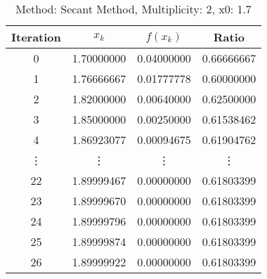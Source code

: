 \begin{table}
\centering
\caption{Method: Secant Method, Multiplicity: 2, x0: 1.7}
\label{tab:table_Secant_Method_2_1_7}
\begin{tabular}{c c c c}
\toprule
Iteration &      $x_k$ &   $f(x_k)$ &      Ratio \\
\midrule
        0 & 1.70000000 & 0.04000000 & 0.66666667 \\
        1 & 1.76666667 & 0.01777778 & 0.60000000 \\
        2 & 1.82000000 & 0.00640000 & 0.62500000 \\
        3 & 1.85000000 & 0.00250000 & 0.61538462 \\
        4 & 1.86923077 & 0.00094675 & 0.61904762 \\
   \vdots &     \vdots &     \vdots &     \vdots \\
       22 & 1.89999467 & 0.00000000 & 0.61803399 \\
       23 & 1.89999670 & 0.00000000 & 0.61803399 \\
       24 & 1.89999796 & 0.00000000 & 0.61803399 \\
       25 & 1.89999874 & 0.00000000 & 0.61803399 \\
       26 & 1.89999922 & 0.00000000 & 0.61803399 \\
\bottomrule
\end{tabular}
\end{table}

